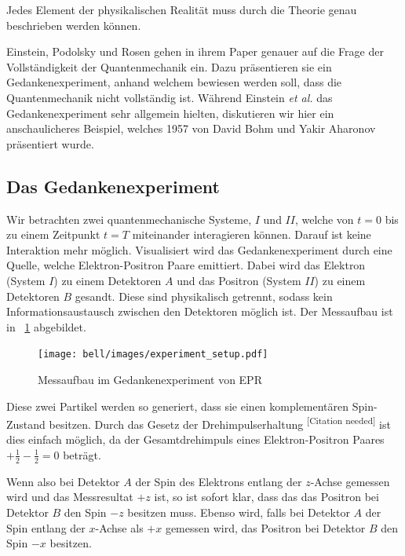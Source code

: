 \begin{refsection}
\begin{definition}\label{def:bell:Vollstaendigkeit}
    Jedes Element der physikalischen Realit\"at muss durch die Theorie
    genau beschrieben werden k\"onnen.
\end{definition}

Einstein, Podolsky und Rosen gehen in ihrem Paper genauer auf die Frage
der Vollst\"andigkeit der Quantenmechanik ein.
Dazu pr\"asentieren sie ein Gedankenexperiment, anhand welchem bewiesen
werden soll, dass die Quantenmechanik nicht vollst\"andig ist.
W\"ahrend Einstein \emph{et al.} das Gedankenexperiment sehr
allgemein hielten, diskutieren wir hier ein anschaulicheres Beispiel, welches
1957 von David Bohm und Yakir Aharonov \cite{Bell:Bohm1957} pr\"asentiert
wurde.

\subsection{Das Gedankenexperiment\label{subsection:bell:epr:idee}}
Wir betrachten zwei quantenmechanische Systeme, $I$ und $II$,
welche von $t=0$ bis zu einem Zeitpunkt $t=T$ miteinander 
interagieren k\"onnen. Darauf ist keine Interaktion mehr m\"oglich.
Visualisiert wird das Gedankenexperiment durch eine Quelle, welche
Elektron-Positron Paare emittiert. 
Dabei wird das Elektron (System $I$) zu einem Detektoren $A$ und das 
Positron (System $II$) zu einem Detektoren $B$ gesandt.
Diese sind physikalisch getrennt, sodass kein Informationsaustausch
zwischen den Detektoren m\"oglich ist.
Der Messaufbau ist in \figurename~\ref{fig:bell:EPR_Messaufbau} abgebildet.

\begin{figure}
    \centering
    \texttt{[image: bell/images/experiment\_setup.pdf]}
    \caption{Messaufbau im Gedankenexperiment von EPR}
    \label{fig:bell:EPR_Messaufbau}
\end{figure}

Diese zwei Partikel werden so generiert, dass sie einen komplement\"aren
Spin-Zustand besitzen. 
Durch das Gesetz der Drehimpulserhaltung \textsuperscript{[Citation needed]}
ist dies einfach m\"oglich, da der Gesamtdrehimpuls eines Elektron-Positron Paares $+\frac12 - \frac12 = 0$ betr\"agt.

Wenn also bei Detektor $A$ der Spin des Elektrons entlang der $z$-Achse
gemessen wird und das Messresultat $+z$ ist, so ist sofort klar, dass
das das Positron bei Detektor $B$ den Spin $-z$ besitzen muss. 
Ebenso wird, falls bei Detektor $A$ der Spin entlang der $x$-Achse als $+x$
gemessen wird, das Positron bei Detektor $B$ den Spin $-x$ besitzen.


\end{refsection}
